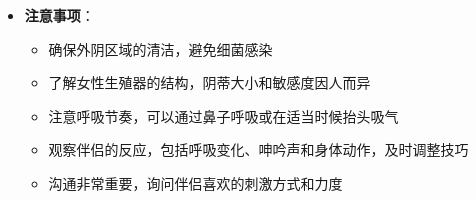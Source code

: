 \documentclass[12pt,UTF8]{ctexbook}
\begin{document}
\begin{itemize}
\begin{itemize}
\begin{itemize}
      \item 阴蒂刺激+G点刺激：用舌头刺激阴蒂，同时用手指轻轻按摩G点
      \item 阴唇撑开+阴蒂刺激：用手指轻轻撑开小阴唇，使阴蒂完全暴露，再用舌头刺激
      \item 肛门周围刺激：在刺激阴蒂的同时，用手指轻轻按摩肛门周围区域
      \end{itemize}
    \item \textbf{振动与温度变化}：
      \begin{itemize}
      \item 使用振动器辅助：将振动器调至低档位，放在阴蒂上，同时用舌头舔舐
      \item 冷热刺激：用冰或温水湿润嘴唇，再进行口交，创造温度变化
      \end{itemize}
    \item \textbf{节奏与力度控制}：
      \begin{itemize}
      \item 渐进式增强：从缓慢轻柔的动作开始，逐渐增加速度和力度
      \item 间歇性刺激：在伴侣即将达到高潮时暂停，然后再继续，增加高潮的强度
      \item 爆发式刺激：在伴侣接近高潮时，突然增加刺激的速度和力度
      \end{itemize}
    \end{itemize}
  \item \textbf{注意事项}：
    \begin{itemize}
    \item 确保外阴区域的清洁，避免细菌感染
    \item 了解女性生殖器的结构，阴蒂大小和敏感度因人而异
    \item 注意呼吸节奏，可以通过鼻子呼吸或在适当时候抬头吸气
    \item 观察伴侣的反应，包括呼吸变化、呻吟声和身体动作，及时调整技巧
    \item 沟通非常重要，询问伴侣喜欢的刺激方式和力度
    \end{itemize}
  \end{itemize}
\end{document}
